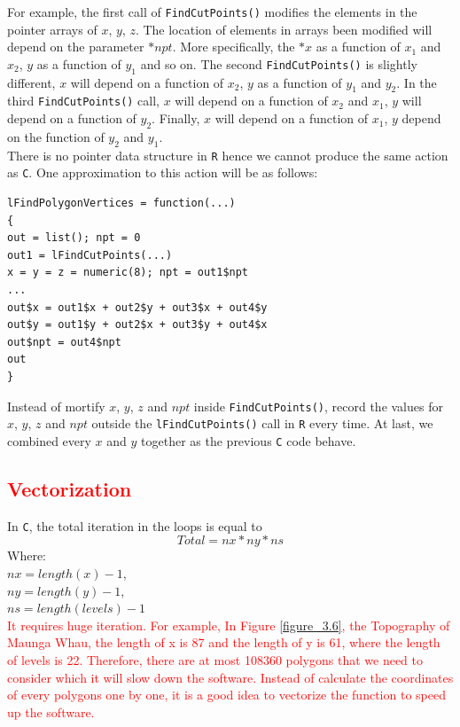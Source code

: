 \documentclass[paper=a4, fontsize=11pt]{report}
\begin{document}
For example, the first call of \texttt{FindCutPoints()} modifies the elements in the pointer arrays of $x$, $y$, $z$. The location of elements in arrays been modified will depend on the parameter $*npt$. More specifically, the $*x$ as a function of $x_1$ and $x_2$, $y$ as a function of $y_1$ and so on. The second \texttt{FindCutPoints()} is slightly different, $x$ will depend on a function of $x_2$, $y$ as a function of $y_1$ and $y_2$. In the third \texttt{FindCutPoints()} call, $x$ will depend on a function of $x_2$ and $x_1$, $y$ will depend on a function of $y_2$. Finally, $x$ will depend on a function of $x_1$, $y$ depend on the function of $y_2$ and $y_1$. \\

There is no pointer data structure in \texttt{R} hence we cannot produce the same action as \texttt{C}. One approximation to this action will be as follows:
\begin{lstlisting}
lFindPolygonVertices = function(...)
{
out = list(); npt = 0
out1 = lFindCutPoints(...)
x = y = z = numeric(8); npt = out1$npt
...
out$x = out1$x + out2$y + out3$x + out4$y
out$y = out1$y + out2$x + out3$y + out4$x
out$npt = out4$npt
out
}
\end{lstlisting}
Instead of mortify $x$, $y$, $z$ and $npt$ inside \texttt{FindCutPoints()}, record the values for $x$, $y$, $z$ and $npt$ outside the \texttt{lFindCutPoints()} call in \texttt{R} every time. At last, we combined every $x$ and $y$ together as the previous \texttt{C} code behave. 


\subsection{\textcolor{red}{Vectorization}}
In \texttt{C}, the total iteration in the loops is equal to
\begin{equation}
Total = nx * ny * ns
\end{equation}
Where:\\
$nx = length(x) - 1$,\\
$ny = length(y) - 1$,\\
$ns = length(levels) - 1$\\

\textcolor{red}{
	It requires huge iteration. For example, In Figure \ref{figure_3.6}, the Topography of Maunga Whau, the length of x is 87 and the length of y is 61, where the length of levels is 22. Therefore, there are at most 108360 polygons that we need to consider which it will slow down the software. Instead of calculate the coordinates of every polygons one by one, it is a good idea to vectorize the function to speed up the software.}
\end{document}
